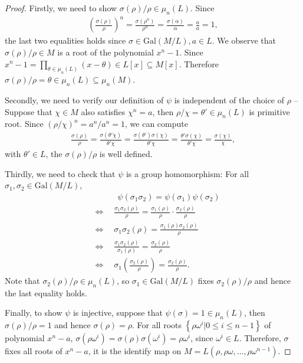 \documentclass[11pt]{book}
\begin{document}
\begin{proof}
Firstly, we need to show \(\sigma(\rho)/ \rho \in \mu_n(L)\). Since \begin{align*}
    \left(\frac{\sigma(\rho)}{\rho} \right)^n = \frac{\sigma(\rho^n)}{\rho^n} = \frac{\sigma(\alpha)}{\alpha} = \frac{a}{a} = 1,
\end{align*}  
the last two equalities holds since \(\sigma \in \mathrm{Gal}(M/L), a \in L\). We observe that \(\sigma(\rho)/\rho \in M\) is a root of the polynomial \(x^n -1\). Since \(x^n -1 = \displaystyle\prod_{\theta \in \mu_n(L)} (x-\theta) \in L[x] \subseteq M[x]\).  Therefore \( \sigma(\rho)/\rho = \theta \in \mu_n(L) \subseteq \mu_n(M)\).

Secondly, we need to verify our definition of $\psi$ is independent of the choice of \(\rho\) -- Suppose that \(\chi \in M\) also satisfies \(\chi^n = a\), then \(\rho/ \chi = \theta' \in \mu_n(L)\) is primitive root. Since \((\rho/\chi)^n = a^n / a^n =1\), we can compute
\begin{align*}
    \frac{\sigma(\rho)}{\rho} = \frac{\sigma(\theta' \chi)}{\theta' \chi} = \frac{\sigma(\theta')\sigma(\chi)}{\theta' \chi} = \frac{\theta'\sigma(\chi)}{\theta'\chi} = \frac{\sigma(\chi)}{\chi},
\end{align*}
with \(\theta' \in L\), the \(\sigma(\rho)/\rho\) is well defined.

Thirdly, we need to check that \(\psi\) is a group homomorphism: For all \(\sigma_1 , \sigma_2 \in \mathrm{Gal}(M/L)\),
\begin{align*}
     & \quad \quad \quad \psi(\sigma_1 \sigma_2) = \psi(\sigma_1) \psi(\sigma_2)\\
     &\Leftrightarrow \quad\frac{\sigma_1\sigma_2(\rho)}{\rho} = \frac{\sigma_1(\rho)}{\rho} \cdot\frac{\sigma_2(\rho)}{\rho}\\
    &\Leftrightarrow \quad  \sigma_1 \sigma_2(\rho) = \frac{\sigma_1(\rho) \sigma_2(\rho)}{\rho}\\
     &\Leftrightarrow \quad \frac{\sigma_1 \sigma_2(\rho)}{\sigma_1(\rho)} = \frac{\sigma_2(\rho)}{\rho}\\
   &\Leftrightarrow \quad 
\sigma_1\left(\frac{\sigma_2(\rho)}{\rho}\right) = \frac{\sigma_2(\rho)}{\rho}.
\end{align*}
Note that \(\sigma_2(\rho)/\rho \in \mu_n(L)\), so \(\sigma_1\in \mathrm{Gal}(M/L)\) fixes \(\sigma_2(\rho)/\rho\) and hence the last equality holds.

Finally, to show \(\psi\) is injective, suppose that \(\psi(\sigma) = 1 \in \mu_n(L)\), then \(\sigma(\rho)/\rho = 1\) and hence \(\sigma(\rho) = \rho\). For all roots \(\left\{ \rho \omega^i| 0 \leq i \leq n-1\right\}\) of polynomial \(x^n -a\), \(\sigma(\rho \omega^i) = \sigma(\rho) \sigma(\omega^i) = \rho \omega^i\), since \(\omega^i \in L\). Therefore, \(\sigma\) fixes all roots of \(x^n -a\), it is the identify map on \(M = L(\rho, \rho\omega, \dots, \rho \omega^{n-1})\).
\end{proof}
\end{document}
